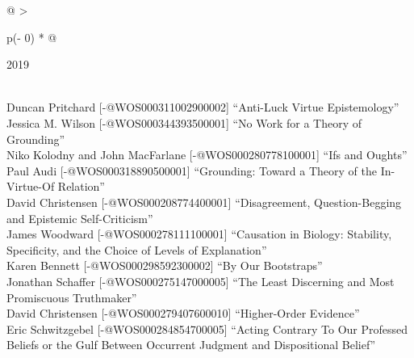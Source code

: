 \documentclass[
  10pt,
  letterpaper,
  DIV=11,
  numbers=noendperiod,
  twoside]{scrartcl}
\begin{document}
\begin{longtable}[]{@{}
  >{\raggedright\arraybackslash}p{(\columnwidth - 0\tabcolsep) * }@{}}

\caption{\label{tbl-top-ten-2010}Most cited articles published less than
ten years ago as of 2019.}

\tabularnewline

\toprule\noalign{}
\begin{minipage}[b]{\linewidth}\raggedright
2019
\end{minipage} \\
\midrule\noalign{}
\endhead
\bottomrule\noalign{}
\endlastfoot
Duncan Pritchard {[}-@WOS000311002900002{]} ``Anti-Luck Virtue
Epistemology'' \\
Jessica M. Wilson {[}-@WOS000344393500001{]} ``No Work for a Theory of
Grounding'' \\
Niko Kolodny and John MacFarlane {[}-@WOS000280778100001{]} ``Ifs and
Oughts'' \\
Paul Audi {[}-@WOS000318890500001{]} ``Grounding: Toward a Theory of the
In-Virtue-Of Relation'' \\
David Christensen {[}-@WOS000208774400001{]} ``Disagreement,
Question-Begging and Epistemic Self-Criticism'' \\
James Woodward {[}-@WOS000278111100001{]} ``Causation in Biology:
Stability, Specificity, and the Choice of Levels of Explanation'' \\
Karen Bennett {[}-@WOS000298592300002{]} ``By Our Bootstraps'' \\
Jonathan Schaffer {[}-@WOS000275147000005{]} ``The Least Discerning and
Most Promiscuous Truthmaker'' \\
David Christensen {[}-@WOS000279407600010{]} ``Higher-Order
Evidence'' \\
Eric Schwitzgebel {[}-@WOS000284854700005{]} ``Acting Contrary To Our
Professed Beliefs or the Gulf Between Occurrent Judgment and
Dispositional Belief'' \\

\end{longtable}
\end{document}

